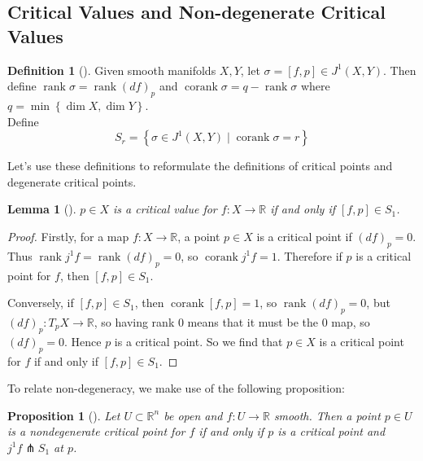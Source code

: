 \documentclass[reqno]{amsart}
\newtheorem{lemma}[theorem]{Lemma}
\newtheorem{proposition}[theorem]{Proposition}
\theoremstyle{definition}
\newtheorem{definition}[theorem]{Definition}
\theoremstyle{remark}
\DeclareMathOperator{\corank}{corank}
\DeclareMathOperator{\rank}{rank}
\begin{document}
\subsection{Critical Values and Non-degenerate Critical
Values}

\begin{definition}[]
    Given smooth manifolds $X,Y$, let
    $\sigma = \left[ f,p \right]
    \in J^{1}(X,Y)$. Then define
    $\rank \sigma = \rank \left( df \right)_p$ and
    $\corank \sigma = q - \rank \sigma$ where
    $q = \min \left\{ \dim X, \dim Y \right\} $.\\
    Define
    \[
    S_r = \left\{ \sigma \in J^{1}(X,Y)  \mid
    \corank \sigma = r \right\}
    \]
\end{definition}

Let's use these definitions to
reformulate the definitions of critical points and
degenerate critical points.\\

\begin{lemma}[]
    $p \in X$ is a critical value for
    $f \colon X \to \mathbb{R}$ if and only if
    $\left[ f,p \right] \in S_1$.
\end{lemma}

\begin{proof}
Firstly, for a map $f \colon X \to \mathbb{R}$, a
point $p \in X$ is a critical point if
$(df)_p = 0$. Thus
$\rank j^{1} f = \rank (df)_p = 0$, so
$\corank j^{1}f = 1$. Therefore
 if $p$ is a critical point for  $f$, then
 $\left[ f,p \right] \in S_1$.

 Conversely, if
 $\left[ f,p \right] \in S_1$, then
 $\corank \left[ f,p \right] = 1$, so
 $\rank \left( df \right)_p = 0$, but
 $\left( df \right)_p \colon T_p X \to \mathbb{R}$, so
 having rank $0$ means that it must be the $0$ map, so
 $(df)_p = 0$. Hence $p$ is a critical point. So we find that
 $p \in X$ is a critical point for $f$ if and only if
 $\left[ f,p \right] \in S_1$.
\end{proof}

To relate non-degeneracy, 
we make use of the following proposition:
 \begin{proposition}[]\label{Nondegenerate-Equiv-Jets}
     Let $U \subset \mathbb{R}^{n}$ be open
     and $f \colon U \to \mathbb{R}$ smooth. Then
     a point $p \in U$ is a nondegenerate critical point
     for $f$ if and only if
     $p$ is a critical point and
     $j^{1}f \pitchfork S_1$ at $p$.
 \end{proposition}
\end{document}
